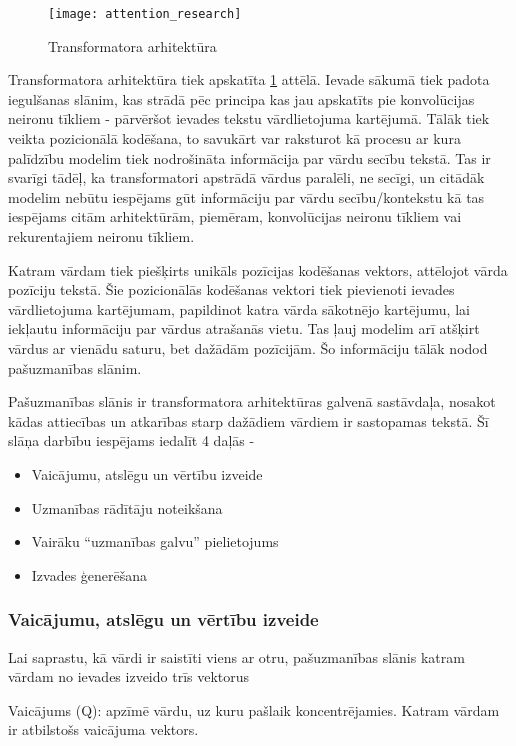 \begin{figure}[H]
	\texttt{[image: attention\_research]}
	\caption{Transformatora arhitektūra \cite{vaswani2023attention} }
	\label{fig:vaswani2023attention_img}
\end{figure}

Transformatora arhitektūra tiek apskatīta \ref{fig:vaswani2023attention_img} attēlā. Ievade sākumā tiek padota iegulšanas slānim, kas strādā pēc principa kas jau apskatīts pie konvolūcijas neironu tīkliem - pārvēršot ievades tekstu vārdlietojuma kartējumā. Tālāk tiek veikta pozicionālā kodēšana, to savukārt var raksturot kā procesu ar kura palīdzību modelim tiek nodrošināta informācija par vārdu secību tekstā. Tas ir svarīgi tādēļ, ka transformatori apstrādā vārdus paralēli, ne secīgi, un citādāk modelim nebūtu iespējams gūt informāciju par vārdu secību/kontekstu kā tas iespējams citām arhitektūrām, piemēram, konvolūcijas neironu tīkliem vai rekurentajiem neironu tīkliem.

Katram vārdam tiek piešķirts unikāls pozīcijas  kodēšanas vektors, attēlojot vārda pozīciju tekstā. Šie pozicionālās kodēšanas vektori tiek pievienoti ievades vārdlietojuma kartējumam, papildinot katra vārda sākotnējo kartējumu, lai iekļautu informāciju par vārdus atrašanās vietu. Tas ļauj modelim arī atšķirt vārdus ar vienādu saturu, bet dažādām pozīcijām. Šo informāciju tālāk nodod pašuzmanības slānim.

Pašuzmanības slānis ir transformatora arhitektūras galvenā sastāvdaļa, nosakot kādas attiecības un atkarības starp dažādiem vārdiem ir sastopamas tekstā. Šī slāņa darbību iespējams iedalīt 4 daļās - 
\begin{itemize}
\item Vaicājumu, atslēgu un vērtību izveide
\item Uzmanības rādītāju noteikšana
\item Vairāku “uzmanības galvu” pielietojums
\item Izvades ģenerēšana
\end{itemize}

\subsubsection{Vaicājumu, atslēgu un vērtību izveide}
Lai saprastu, kā vārdi ir saistīti viens ar otru, pašuzmanības slānis katram vārdam no ievades izveido trīs vektorus

Vaicājums (Q): apzīmē vārdu, uz kuru pašlaik koncentrējamies. Katram vārdam ir atbilstošs vaicājuma vektors.

